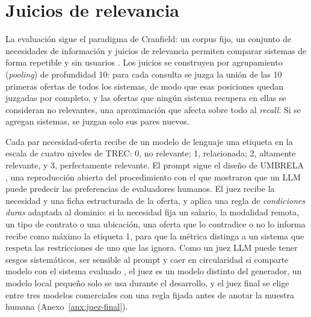 \section{Juicios de relevancia}
\label{sec:met-juicios}

La evaluación sigue el paradigma de Cranfield: un corpus fijo, un conjunto de necesidades de información y juicios de relevancia permiten comparar sistemas de forma repetible y sin usuarios \citep{Sanderson2010}. Los juicios se construyen por agrupamiento (\textit{pooling}) de profundidad 10: para cada consulta se juzga la unión de las 10 primeras ofertas de todos los sistemas, de modo que esas posiciones quedan juzgadas por completo, y las ofertas que ningún sistema recupera en ellas se consideran no relevantes, una aproximación que afecta sobre todo al \textit{recall}. Si se agregan sistemas, se juzgan solo sus pares nuevos.

Cada par necesidad-oferta recibe de un modelo de lenguaje una etiqueta en la escala de cuatro niveles de TREC: 0, no relevante; 1, relacionada; 2, altamente relevante, y 3, perfectamente relevante. El prompt sigue el diseño de UMBRELA \citep{Upadhyay2024}, una reproducción abierta del procedimiento con el que \citet{Thomas2024} mostraron que un LLM puede predecir las preferencias de evaluadores humanos. El juez recibe la necesidad y una ficha estructurada de la oferta, y aplica una regla de \emph{condiciones duras} adaptada al dominio: si la necesidad fija un salario, la modalidad remota, un tipo de contrato o una ubicación, una oferta que lo contradice o no lo informa recibe como máximo la etiqueta 1, para que la métrica distinga a un sistema que respeta las restricciones de uno que las ignora. Como un juez LLM puede tener sesgos sistemáticos, ser sensible al prompt y caer en circularidad si comparte modelo con el sistema evaluado \citep{Faggioli2023,Zheng2023}, el juez es un modelo distinto del generador, un modelo local pequeño solo se usa durante el desarrollo, y el juez final se elige entre tres modelos comerciales con una regla fijada antes de anotar la muestra humana (Anexo~\ref{anx:juez-final}).

